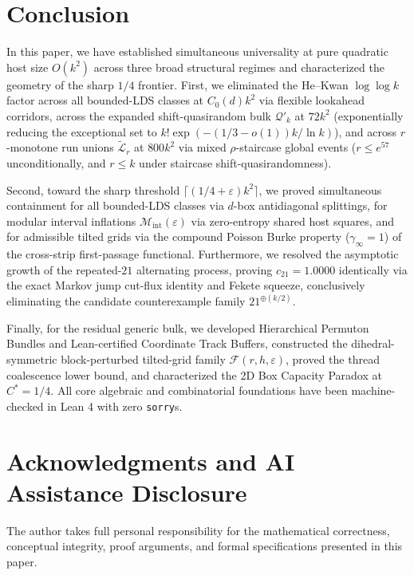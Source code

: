 \documentclass[
  11pt,
]{article}
\begin{document}
\section{Conclusion}\label{sec:conclusion}

In this paper, we have established simultaneous universality at pure quadratic host size $O(k^2)$ across three broad structural regimes and characterized the geometry of the sharp $1/4$ frontier. First, we eliminated the He--Kwan $\log\log k$ factor across all bounded-LDS classes at $C_0(d)k^2$ via flexible lookahead corridors, across the expanded shift-quasirandom bulk $\mathcal{Q}'_k$ at $72k^2$ (exponentially reducing the exceptional set to $k!\exp(-(1/3-o(1))k/\ln k)$), and across $r$-monotone run unions $\widetilde{\mathcal{L}}_r$ at $800k^2$ via mixed $\rho$-staircase global events ($r \le e^{57}$ unconditionally, and $r \le k$ under staircase shift-quasirandomness).

Second, toward the sharp threshold $\lceil(1/4+\varepsilon)k^2\rceil$, we proved simultaneous containment for all bounded-LDS classes via $d$-box antidiagonal splittings, for modular interval inflations $\mathcal{M}_{\mathrm{int}}(\varepsilon)$ via zero-entropy shared host squares, and for admissible tilted grids via the compound Poisson Burke property ($\gamma_\infty = 1$) of the cross-strip first-passage functional. Furthermore, we resolved the asymptotic growth of the repeated-$21$ alternating process, proving $c_{21} = 1.0000$ identically via the exact Markov jump cut-flux identity and Fekete squeeze, conclusively eliminating the candidate counterexample family $21^{\oplus (k/2)}$.

Finally, for the residual generic bulk, we developed Hierarchical Permuton Bundles and Lean-certified Coordinate Track Buffers, constructed the dihedral-symmetric block-perturbed tilted-grid family $\mathcal{F}(r, h, \varepsilon)$, proved the thread coalescence lower bound, and characterized the 2D Box Capacity Paradox at $C^* = 1/4$. All core algebraic and combinatorial foundations have been machine-checked in Lean 4 with zero \texttt{sorry}s.

\section{Acknowledgments and AI Assistance
Disclosure}\label{sec:acknowledgments}

The author takes full personal responsibility for the mathematical
correctness, conceptual integrity, proof arguments, and formal
specifications presented in this paper.
\end{document}
